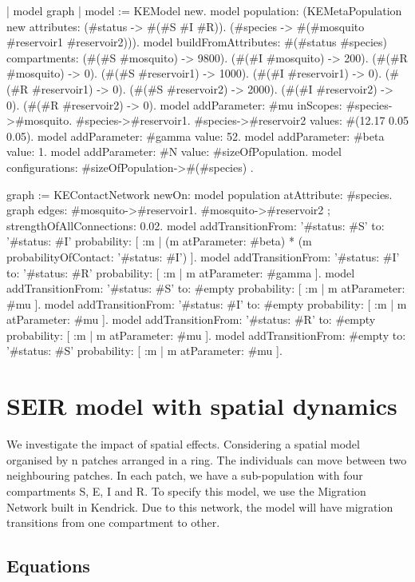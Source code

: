\documentclass[a4paper,10pt,twoside]{book}
\begin{document}
\begin{code}{}
| model graph |
	model := KEModel new.
	model
		population:
			(KEMetaPopulation new
				attributes:
					{(#status -> #(#S #I #R)).
					(#species -> #(#mosquito #reservoir1 #reservoir2))}).
	model
		buildFromAttributes: #(#status #species)
		compartments:
			{(#(#S #mosquito) -> 9800).
			(#(#I #mosquito) -> 200).
			(#(#R #mosquito) -> 0).
			(#(#S #reservoir1) -> 1000).
			(#(#I #reservoir1) -> 0).
			(#(#R #reservoir1) -> 0).
			(#(#S #reservoir2) -> 2000).
			(#(#I #reservoir2) -> 0).
			(#(#R #reservoir2) -> 0)}.
	model addParameter: #mu
		   inScopes: {
				#species->#mosquito.
				#species->#reservoir1.
				#species->#reservoir2}
		   values: #(12.17 0.05 0.05).
	model addParameter: #gamma value: 52.
	model addParameter: #beta value: 1.
	model addParameter: #N value: #sizeOfPopulation.
	model configurations: { #sizeOfPopulation->#(#species) }.

	graph := KEContactNetwork
			newOn: model population
			atAttribute: #species.
	graph edges: { #mosquito->#reservoir1. #mosquito->#reservoir2 };
			strengthOfAllConnections: 0.02.
	model
		addTransitionFrom: '{#status: #S}'
		to: '{#status: #I}'
		probability: [ :m | (m atParameter: #beta) * (m probabilityOfContact: '{#status: #I}') ].
	model
		addTransitionFrom: '{#status: #I}'
		to: '{#status: #R}'
		probability: [ :m | m atParameter: #gamma ].
	model
		addTransitionFrom: '{#status: #S}'
		to: #empty
		probability: [ :m | m atParameter: #mu ].
	model
		addTransitionFrom: '{#status: #I}'
		to: #empty
		probability: [ :m | m atParameter: #mu ].
	model
		addTransitionFrom: '{#status: #R}'
		to: #empty
		probability: [ :m | m atParameter: #mu ].
	model
		addTransitionFrom: #empty
		to: '{#status: #S}'
		probability: [ :m | m atParameter: #mu ].
\end{code}

\section{ SEIR model with spatial dynamics}
We investigate the impact of spatial effects.
Considering a spatial model organised by n patches arranged in a ring.
The individuals can move between two neighbouring patches.
In each patch, we have a sub-population with four compartments S, E, I and R.
To specify this model, we use the Migration Network built in Kendrick. Due to this network, the model will have migration transitions from one compartment to other.
\subsection{ Equations}
\end{document}

